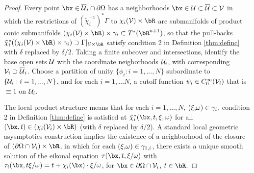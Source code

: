 \begin{proof}
Every point $\bx \in \overline{\cal U}_i \cap \partial \Omega$ has a
neighborhoods $\bx \in {\cal U}\subset \overline{\cal U} \subset {\cal
  V}$ in which the
restrictions of $(\tilde{\chi}_i^{-1})^*\Gamma$ to $\chi_i({\cal V}) \times \bR$ are submanifolds of product conic
submanifolds $(\chi_i({\cal V}) \times \bR) \times \gamma_i
\subset T^*(\bR^{n+1})$, so that the pull-backs
$\tilde{\chi}_i^*((\chi_i({\cal V}) \times \bR) \times \gamma_i)
\supset \Gamma|_{{\cal V} \times \bR}$ 
satisfy condition 2 in Definition \ref{thm:definc} with $\delta$
replaced by $\delta/2$. 
Taking a finite subcover and intersections, identify the base open sets ${\cal U}$ with
the coordinate neigborhoods ${\cal U}_i$, with corresponding ${\cal
  V}_i \supset \overline{\cal U}_i$.
Choose a partition of unity $\{\phi_i: i=1,...,N\}$ subordinate to
$\{{\cal U}_i:i=1,...,N\}$, and for each $i=1,...N$, a cutoff function
$\psi_i\in C_0^{\infty}({\cal V}_i)$ that is $\equiv 1$ on ${\cal U}_i$. 

The local product structure means that for each $i=1,...,N$, $({\bf \xi,}\omega) \in \gamma_{i}$,  condition 2 in
Definition \ref{thm:definc} is satisfied at $\tilde{\chi}_i^*(\bx,t,{\bf \xi},\omega)$ for all $(\bx,t) \in
(\chi_i({\cal V}_i) \times \bR)$  (with $\delta$ replaced by
$\delta/2$).
A standard local geometric asysmptotics construction implies the existence of a 
neighborhood of the closure of $(\partial \Omega \cap {\cal
  V}_i)\times \bR$,  in which for each $({\bf \xi,}\omega) \in
\gamma_{1,i}$, there exists a unique smooth solution of the eikonal
equation $\tau(\bx,t,{\bf \xi}/\omega)$ with $\tau_i(\bx,t {\bf \xi}/\omega) = t+\chi_i(\bx) \cdot {\bf
  \xi}/\omega$, for $\bx \in \partial \Omega \cap {\cal  V}_i$, $t \in
\bR$.


\end{proof}
